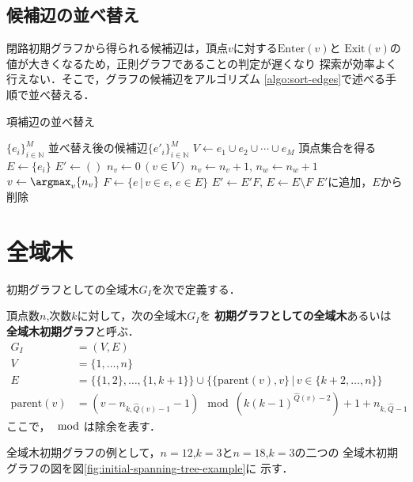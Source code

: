 \subsection*{候補辺の並べ替え}
閉路初期グラフから得られる候補辺は，頂点$v$に対する$\text{Enter}(v)$と
$\text{Exit}(v)$の値が大きくなるため，正則グラフであることの判定が遅くなり
探索が効率よく行えない．そこで，グラフの候補辺をアルゴリズム
\ref{algo:sort-edges}で述べる手順で並べ替える．
\begin{algorithm}[H]
  \caption{項補辺の並べ替え}
  \label{algo:sort-edges}
  \begin{algorithmic}[1]
    \Require $\{e_i\}_{i\in\mathbb{N}}^M$
    \Ensure 並べ替え後の候補辺$\{e'_i\}_{i\in\mathbb{N}}^M$
    \State $V\gets e_1\cup e_2\cup\cdots\cup e_M$
    \Comment 頂点集合を得る
    \State $E\gets\{e_i\}$
    \State $E'\gets()$
    \State $n_v\gets0\,(v\in V)$
    \State $n_v\gets n_v+1,\,n_w\gets n_w+1$
    \EndFor
    \State $v\gets \argmax_v\{n_v\}$
    \State $F\gets \{e\,|\,v\in e,\,e\in E\}$
    \State $E'\gets E'F,\,E\gets E\setminus F$
    \Comment $E'$に追加，$E$から削除
    \EndWhile
    \EndProcedure
  \end{algorithmic}
\end{algorithm}

\section{全域木}
\label{sect:initial-spanning-tree}
初期グラフとしての全域木$G_I$を次で定義する．
\begin{definition}[初期グラフとしての全域木]
  \label{def:stree-initial-graph}
  頂点数$n$,次数$k$に対して，次の全域木$G_I$を
  \textbf{初期グラフとしての全域木}あるいは
  \textbf{全域木初期グラフ}と呼ぶ．
  \begin{equation}
    \begin{aligned}
      G_I&=(V,E) \\
      V&=\{1,\ldots,n\} \\
      E&=\{\{1,2\},\ldots,\{1,k+1\}\}\cup
      \{\{\text{parent}(v),v\}\,|\,v\in \{k+2,\ldots,n\}\}  \\
      \text{parent}(v)&=
      (v-n_{k,\hat{Q}(v)-1}-1)\mod(k(k-1)^{\hat{Q}(v)-2})+1+n_{k,\hat{Q}-1}
    \end{aligned}
  \end{equation}
  ここで，$\mod$は除余を表す．
\end{definition}
全域木初期グラフの例として，$n=12$,$k=3$と$n=18$,$k=3$の二つの
全域木初期グラフの図を図\ref{fig:initial-spanning-tree-example}に
示す．

